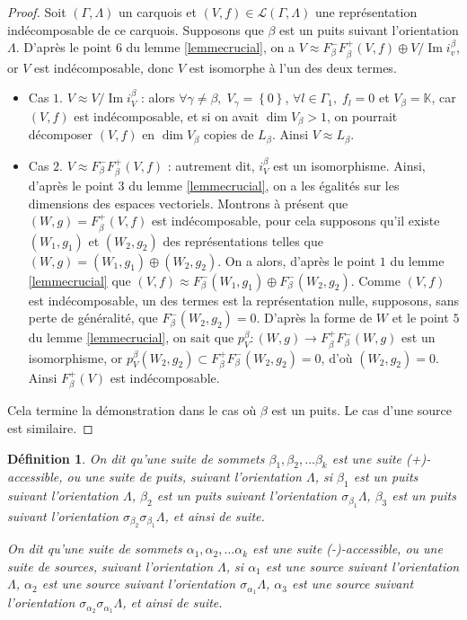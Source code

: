 \documentclass[a4paper,11pt]{article}
\newtheorem{defi}[thm]{Définition}%
\DeclareMathOperator{\Img}{Im}
\begin{document}
\begin{proof}
	Soit $(\Gamma,\Lambda)$ un carquois et $(V,f)\in\mathscr L(\Gamma,\Lambda)$ une représentation indécomposable de ce carquois. Supposons que $\beta$ est un puits suivant l'orientation $\Lambda$. D'après le point $6$ du lemme \ref{lemmecrucial}, on a $V\approx F_\beta^-F_\beta^+(V,f)\oplus V/\Img i_v^\beta$, or $V$ est indécomposable, donc $V$ est isomorphe à l'un des deux termes.
	\begin{itemize}
		\item Cas $1$. $V\approx V/\Img i_V^\beta$ : alors $\forall \gamma\neq\beta,\;V_\gamma=\left\{ 0 \right\}$, $\forall l\in\Gamma_1,\;f_l=0$ et $V_\beta=\mathbb K$, car $(V,f)$ est indécomposable, et si on avait $\dim V_\beta>1$, on pourrait décomposer $(V,f)$ en $\dim V_\beta$ copies de $L_\beta$. Ainsi $V\approx L_\beta$.
		\item Cas $2$. $V\approx F_\beta^-F_\beta^+(V,f)$ : autrement dit, $i_V^\beta$ est un isomorphisme. Ainsi, d'après le point $3$ du lemme \ref{lemmecrucial}, on a les égalités sur les dimensions des espaces vectoriels. Montrons à présent que $(W,g)=F_\beta^+(V,f)$ est indécomposable, pour cela supposons qu'il existe $(W_1,g_1)$ et $(W_2,g_2)$ des représentations telles que $(W,g)=(W_1,g_1)\oplus(W_2,g_2)$. On a alors, d'après le point $1$ du lemme \ref{lemmecrucial} que $(V,f)\approx F_\beta^-(W_1,g_1)\oplus F_\beta^-(W_2,g_2)$. Comme $(V,f)$ est indécomposable, un des termes est la représentation nulle, supposons, sans perte de généralité, que $F_\beta^-(W_2,g_2)=0$. D'après la forme de $W$ et le point $5$ du lemme \ref{lemmecrucial}, on sait que $p_V^\beta:(W,g)\rightarrow F_\beta^+F_\beta^-(W,g)$ est un isomorphisme, or $p_V^\beta(W_2,g_2)\subset F_\beta^+F_\beta^-(W_2,g_2)=0$, d'où $(W_2,g_2)=0$. Ainsi $F_\beta^+(V)$ est indécomposable. 
	\end{itemize}
Cela termine la démonstration dans le cas où $\beta$ est un puits. Le cas d'une source est similaire.
\end{proof}
\begin{defi}
	On dit qu'une suite de sommets $\beta_1,\beta_2,\dots\beta_k$ est une suite (+)-accessible, ou une \emph{suite de puits}, suivant l'orientation $\Lambda$, si $\beta_1$ est un puits suivant l'orientation $\Lambda$, $\beta_2$ est un puits suivant l'orientation $\sigma_{\beta_1}\Lambda$, $\beta_3$ est un puits suivant l'orientation $\sigma_{\beta_2}\sigma_{\beta_1}\Lambda$, et ainsi de suite.

	On dit qu'une suite de sommets $\alpha_1,\alpha_2,\dots\alpha_k$ est une suite (-)-accessible, ou une \emph{suite de sources}, suivant l'orientation $\Lambda$, si $\alpha_1$ est une source suivant l'orientation $\Lambda$, $\alpha_2$ est une source suivant l'orientation $\sigma_{\alpha_1}\Lambda$, $\alpha_3$ est une source suivant l'orientation $\sigma_{\alpha_2}\sigma_{\alpha_1}\Lambda$, et ainsi de suite.
\end{defi}
\end{document}
